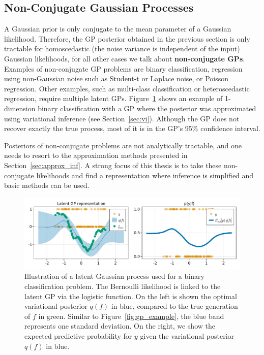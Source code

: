 \subsection{Non-Conjugate Gaussian Processes}
\label{sec:nonconj_gps}
A Gaussian prior is only conjugate to the mean parameter of a Gaussian likelihood.
Therefore, the \ac{GP} posterior obtained in the previous section is only tractable for homoscedastic (the noise variance is independent of the input) Gaussian likelihoods, for all other cases we talk about \textbf{non-conjugate \ac{GPs}}.
Examples of non-conjugate \ac{GP} problems are binary classification, regression using non-Gaussian noise such as Student-t or Laplace noise, or Poisson regression.
Other examples, such as multi-class classification or heteroscedastic regression, require multiple latent \ac{GPs}.
Figure~\ref{fig:gp_class_example} shows an example of 1-dimension binary classification with a \ac{GP} where the posterior was approximated using variational inference (see Section~\ref{sec:vi}).
Although the \ac{GP} does not recover exactly the true process, most of it is in the \ac{GP}'s 95\% confidence interval.

Posteriors of non-conjugate problems are not analytically tractable, and one needs to resort to the approximation methods presented in Section~\ref{sec:approx_inf}.
A strong focus of this thesis is to take these non-conjugate likelihoods and find a representation where inference is simplified and basic methods can be used.

\begin{figure}
    \includegraphics[width=\textwidth]{./chapters/2_background/figures/GP_classification_example.pdf}
    \caption{Illustration of a latent Gaussian process used for a binary classification problem.
    The Bernoulli likelihood is linked to the latent \ac{GP} via the logistic function.
    On the left is shown the optimal variational posterior $q(f)$ in blue, compared to the true generation of $f$ in green.
    Similar to Figure~\ref{fig:gp_example}, the blue band represents one standard deviation.
    On the right, we show the expected predictive probability for $y$ given the variational posterior $q(f)$ in blue.}
    \label{fig:gp_class_example}
\end{figure}

